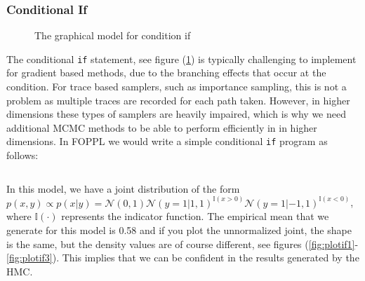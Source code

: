 \documentclass[twoside]{article}
\begin{document}
\subsubsection{Conditional If}
\begin{figure}[ht]
	\begin{center}
		
	\end{center}
	\caption{The graphical model for condition if}
	\label{fig:conif}
\end{figure}
The conditional \texttt{if} statement, see figure (\ref{fig:conif}) is typically challenging to implement for gradient based methods, due to the branching effects that occur at the condition. For trace based samplers, such as importance sampling, this is not a problem as multiple traces are recorded for each path taken. However, in higher dimensions these types of samplers are heavily impaired, which is why we need additional MCMC methods to be able to perform efficiently in in higher dimensions. In FOPPL we would write a simple conditional \texttt{if} program as follows:\inputminted{clojure}{code/conditionalif.clj}
 In this model, we have a joint distribution of the form $p(x,y) \propto p(x|y) = \mathcal{N}(0,1)\mathcal{N}(y = 1|1,1)^{\mathbb{I}(x > 0)}\mathcal{N}(y = 1|-1,1)^{\mathbb{I}(x < 0)}$, where $\mathbb{I}(\cdot)$ represents the indicator function. The empirical mean that we generate for this model is 0.58 and if you plot the unnormalized joint, the shape is the same, but the density values are of course different, see figures (\ref{fig:plotif1}-\ref{fig:plotif3}). This implies that we can be confident in the results generated by the HMC.
\end{document}
